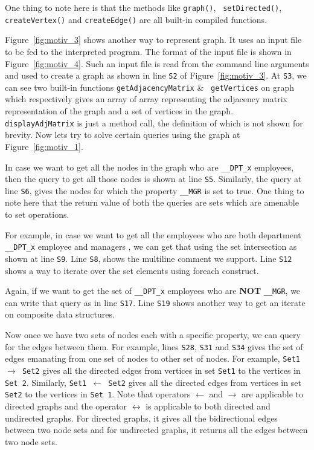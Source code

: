 \begin{example}
{  One thing to note here is that the methods like {\tt graph()}, {\tt 
    setDirected()}, {\tt createVertex()} and {\tt createEdge()} are all built-in 
    compiled functions. 

  
  
  Figure~\ref{fig:motiv_3} shows another way to represent graph.  
  It uses an input file to be fed to
  the interpreted program. The format of the input file is shown in 
  Figure~\ref{fig:motiv_4}. Such an input file is read from the command line 
  arguments and 
  used to create a graph as 
  shown in line {\tt S2} of Figure~\ref{fig:motiv_3}. At {\tt S3}, 
       we can see two built-in functions {\tt getAdjacencyMatrix} \& {\tt 
         getVertices} on graph
  which respectively gives an array of array representing the adjacency matrix 
  representation of the graph and a set of vertices in the graph. {\tt 
    displayAdjMatrix} is just a method call, the definition of which is not 
    shown for brevity. Now lets try to solve certain queries using the graph at 
    Figure~\ref{fig:motiv_1}.

  In case we want to get all the nodes in the graph who are {\tt \_\_DPT\_x} 
  employees, then
  the query to get all those nodes is shown at line {\tt S5}. Similarly, the query at 
  line {\tt S6}, gives
  the nodes for which the property {\tt \_\_MGR} is set to true.  One thing to 
  note here that the return value of both the queries are sets which are 
  amenable to set operations.

  For example, in case we want to get all the employees who are both department 
  {\tt \_\_DPT\_x} employee and managers
  , we can get that using the set intersection as shown at line {\tt S9}. Line 
  {\tt S8}, shows the multiline comment we support. Line {\tt S12} shows a way to 
  iterate over the set elements using foreach construct.

  Again, if we want to get the  set of {\tt \_\_DPT\_x} employees who are 
  \textbf{NOT} {\tt \_\_MGR},
  we can write that query as in line {\tt S17}. Line {\tt S19} shows another way
    to get an iterate on composite data structures. 

 Now once we have two sets of nodes each with a specific property, we can query 
 for the edges between them.
 For example, lines {\tt S28}, {\tt S31} and {\tt S34} gives the set of edges 
   emanating from one set of nodes
 to other set of nodes. For example, {\tt Set1 $\rightarrow$ Set2} gives all the 
 directed edges from vertices in set {\tt Set1} to the vertices in {\tt Set 2}. 
 Similarly, {\tt Set1 $\leftarrow$ Set2} gives all the directed edges from 
 vertices in set {\tt Set2} to the vertices in {\tt Set 1}.
  Note that operators $\leftarrow$ and $\rightarrow$ are 
 applicable to directed graphs
 and the operator $\leftrightarrow$ is applicable to both directed and 
 undirected graphs. For directed graphs,
 it gives all the bidirectional edges between two node sets and for undirected 
   graphs, it returns all the edges between
   two node sets.
    \hfill\psframebox{}}
\end{example}

